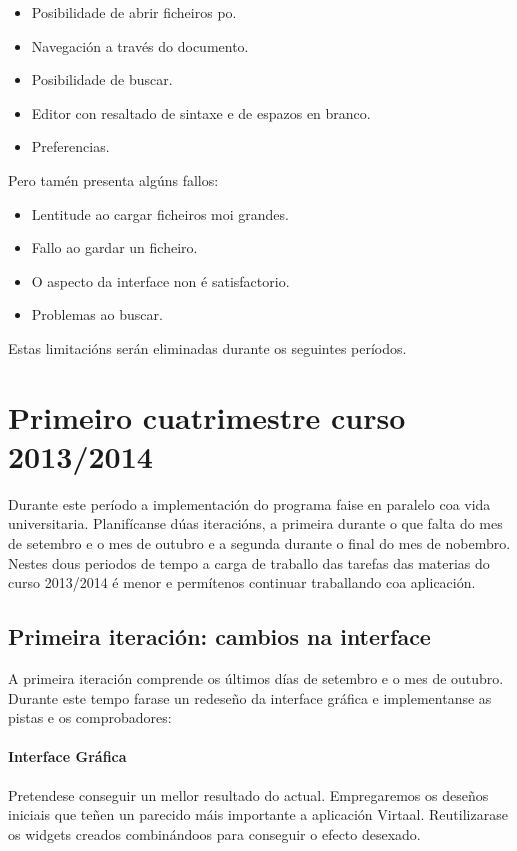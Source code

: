 \begin{itemize}
  \item Posibilidade de abrir ficheiros po.
  \item Navegación a través do documento.
  \item Posibilidade de buscar.
  \item Editor con resaltado de sintaxe e de espazos en branco.
  \item Preferencias.
\end{itemize}

Pero tamén presenta algúns fallos:

\begin{itemize}
  \item Lentitude ao cargar ficheiros moi grandes.
  \item Fallo ao gardar un ficheiro.
  \item O aspecto da interface non é satisfactorio.
  \item Problemas ao buscar.
\end{itemize}

Estas limitacións serán eliminadas durante os seguintes períodos.


\section{Primeiro cuatrimestre curso 2013/2014}

Durante este período a implementación do programa faise en paralelo coa vida universitaria. Planifícanse dúas iteracións, a primeira durante o que falta do mes de setembro e o mes de outubro e a segunda durante o final do mes de nobembro. Nestes dous periodos de tempo a carga de traballo das tarefas das materias do curso 2013/2014 é menor e permítenos continuar traballando coa aplicación.

\subsection{Primeira iteración: cambios na interface}
A primeira iteración comprende os últimos días de setembro e o mes de outubro. Durante este tempo farase un redeseño da interface gráfica e implementanse as pistas e os comprobadores:

\paragraph{Interface Gráfica} Pretendese conseguir un mellor resultado do actual. Empregaremos os deseños iniciais que teñen un parecido máis importante a aplicación Virtaal. Reutilizarase os widgets creados combinándoos para conseguir o efecto desexado.


